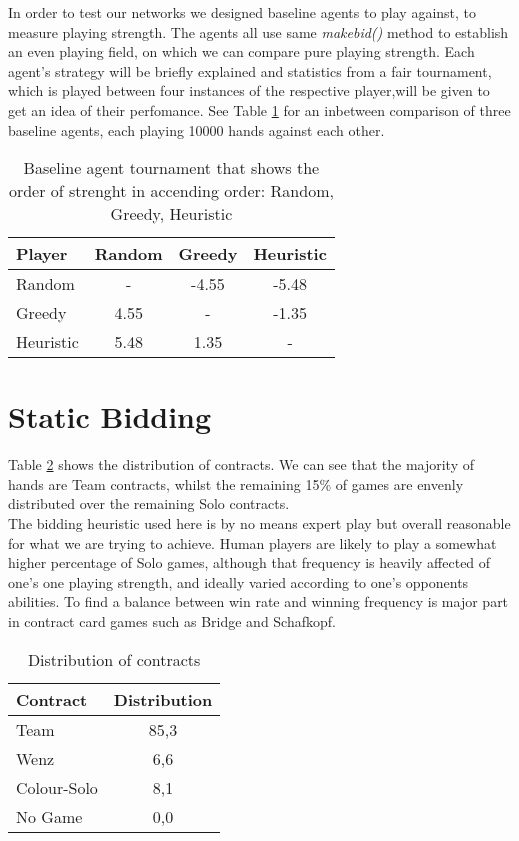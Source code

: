 In order to test our networks we designed baseline agents to play against, to measure playing strength.
The agents all use same \textit{makebid()} method to establish an even playing field, on which we can compare pure
playing strength.
Each agent's strategy will be briefly explained and statistics from a fair tournament, which is played between four
instances of the respective player,will be given to get an idea of their perfomance.
\newline
See Table \ref{tab:baselinevs} for an inbetween comparison of three baseline agents, each playing 10000 hands
against each other.
\begin{table}[!h]
    \centering
    \begin{tabular}{lccc}
        \toprule
        Player    & Random & Greedy & Heuristic \\
        \midrule
        Random    & -      & -4.55  & -5.48     \\
        Greedy    & 4.55   & -      & -1.35     \\
        Heuristic & 5.48   & 1.35   & -         \\
        \bottomrule
    \end{tabular}
    \caption{Baseline agent tournament that shows the order of strenght in accending order: Random, Greedy, Heuristic}
    \label{tab:baselinevs}
\end{table}


\section{Static Bidding}
Table \ref{tab:distributionBidding} shows the distribution of contracts.
We can see that the majority of hands are Team contracts, whilst the remaining 15\% of games are envenly distributed
over the remaining Solo contracts.\\
The bidding heuristic used here is by no means expert play but overall reasonable for what we are trying to achieve.
Human players are likely to play a somewhat higher percentage of Solo games, although that frequency is heavily
affected of one's one playing strength, and ideally varied according to one's opponents abilities.
To find a balance between win rate and winning frequency is major part in contract card games such as Bridge and
Schafkopf.
\begin{table}[!h]
    \centering
    \begin{tabular}{lc}
        \toprule
        Contract    & Distribution \\
        \midrule
        Team        & 85,3         \\
        Wenz        & 6,6          \\
        Colour-Solo & 8,1          \\
        No Game     & 0,0          \\
        \bottomrule
    \end{tabular}
    \caption{Distribution of contracts}
    \label{tab:distributionBidding}
\end{table}


